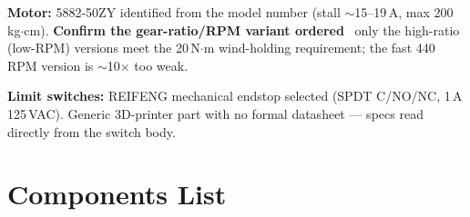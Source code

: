 \documentclass[11pt]{article}
\newcommand{\nd}{\textrm{\textemdash}}                %
\begin{document}
\smallskip
\noindent\textbf{Motor:} 5882-50ZY identified from the model number
(stall $\sim$15--19\,A, max 200\,kg$\cdot$cm). \textbf{Confirm the gear-ratio/RPM
variant ordered} \nd\ only the high-ratio (low-RPM) versions meet the 20\,N$\cdot$m
wind-holding requirement; the fast 440\,RPM version is $\sim$10$\times$ too weak.

\smallskip
\noindent\textbf{Limit switches:} REIFENG mechanical endstop selected (SPDT
C/NO/NC, 1\,A 125\,VAC). Generic 3D-printer part with no formal datasheet ---
specs read directly from the switch body.

\section*{Components List}
\end{document}
